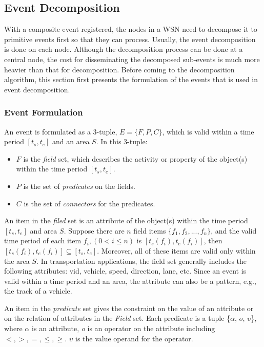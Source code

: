 \documentclass[12pt,journal,draftcls,letterpaper,onecolumn]{elsarticle}
\begin{document}

\subsection {Event Decomposition}

\label {sec:Event Decomposition}

With a composite event registered, the nodes in a WSN need to
decompose it to primitive events first so that they can process.
Usually, the event decomposition is done on each node. Although the
decomposition process can be done at a central node, the cost for
disseminating the decomposed sub-events is much more heavier than
that for decomposition. Before coming to the decomposition
algorithm, this section first presents the formulation of the events
that is used in event decomposition.

\subsubsection{Event Formulation}

An event is formulated as a 3-tuple, $E = \{F, P, C\}$, which is
valid within a time period $[t_s, t_e]$ and an area $S$. In this
3-tuple:
\begin{itemize}
\item $F$ is the \emph{field} set, which
describes the activity or property of the object(s) within the time
period $[t_s, t_e]$.
\item $P$ is the set of \emph{predicates}
on the fields.
\item $C$ is the set of \emph{connectors} for the predicates.
\end{itemize}

An item in the \emph{filed} set is an attribute of the object(s)
within the time period $[t_s, t_e]$ and area $S$. Suppose there are
$n$ field items $\{f_1, f_2, ...,f_n\}$, and the valid time period
of each item $f_i, (0 < i \leq n)$ is $[t_s(f_i), t_e(f_i)]$, then
$[t_s(f_i), t_e(f_i)] \subseteq [t_s, t_e]$. Moreover, all of these
items are valid only within the area $S$. In transportation
applications, the field set generally includes the following
attributes: vid, vehicle, speed, direction, lane, etc. Since an
event is valid within a time period and an area, the attribute can
also be a pattern, e.g., the track of a vehicle.

An item in the \emph{predicate} set gives the constraint on the
value of an attribute or on the relation of attributes in the
\emph{Field} set. Each predicate is a tuple \{$\alpha$, $o$,
$\upsilon$\}, where $\alpha$ is an attribute,
 \emph{o} is an operator on the attribute including$ <, >, =, \leq,
 \geq$. $\upsilon$ is the value operand for the operator.
\end{document}
